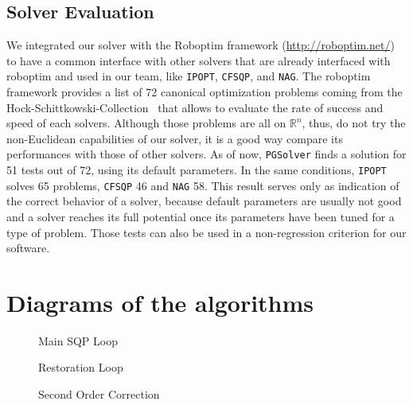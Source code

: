 \subsection{Solver Evaluation}
\label{sub:solver_evaluation}

We integrated our solver with the Roboptim framework (\href{http://roboptim.net/}{http://roboptim.net/}) to have a common interface with other solvers that are already interfaced with roboptim and used in our team, like {\tt IPOPT}, {\tt CFSQP}, and {\tt NAG}.
The roboptim framework provides a list of 72 canonical optimization problems coming from the Hock-Schittkowski-Collection~\cite{Hock1980} that allows to evaluate the rate of success and speed of each solvers.
Although those problems are all on $\mathbb{R}^n$, thus, do not try the non-Euclidean capabilities of our solver, it is a good way compare its performances with those of other solvers.
As of now, {\tt PGSolver} finds a solution for 51 tests out of 72, using its default parameters.
In the same conditions, {\tt IPOPT} solves 65 problems, {\tt CFSQP} 46 and {\tt NAG} 58.
This result serves only as indication of the correct behavior of a solver, because default parameters are usually not good and a solver reaches its full potential once its parameters have been tuned for a type of problem.
Those tests can also be used in a non-regression criterion for our software.


\section{Diagrams of the algorithms}
\label{sec:diagrams_of_the_algorithms}

\begin{figure}[htpb]
  \centering
  
  \caption{Main SQP Loop}
\label{fig:main_sqp_loop}
\end{figure}

\begin{figure}[htpb]
  \begin{minipage}{.5\textwidth}
    \centering
    
    \caption{Restoration Loop}
\label{fig:restoration_loop}
  \end{minipage}%
  \begin{minipage}{.5\textwidth}
    \centering
    
    \caption{Second Order Correction}
\label{fig:second_order_correction}
  \end{minipage}%
\end{figure}

